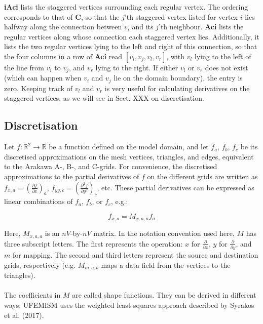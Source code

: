 \documentclass{article}
\begin{document}
\textbf{iAci} lists the staggered vertices surrounding each regular vertex. The ordering corresponds to that of \textbf{C}, so that the $j$'th staggered vertex listed for vertex $i$ lies halfway along the connection between $v_i$ and its $j$'th neighbour. \textbf{Aci} lists the regular vertices along whose connection each staggered vertex lies. Additionally, it lists the two regular vertices lying to the left and right of this connection, so that the four columns in a row of \textbf{Aci} read $[v_i,v_j,v_l,v_r]$, with $v_l$ lying to the left of the line from $v_i$ to $v_j$, and $v_r$ lying to the right. If either $v_l$ or $v_r$ does not exist (which can happen when $v_i$ and $v_j$ lie on the domain boundary), the entry is zero. Keeping track of $v_l$ and $v_r$ is very useful for calculating derivatives on the staggered vertices, as we will see in Sect. XXX on discretisation.\\

\newpage
\subsection{Discretisation}

Let $f: \mathbb{R}^{2} \rightarrow \mathbb{R}$ be a function defined on the model domain, and let $f_a$, $f_b$, $f_c$ be its discretised approximations on the mesh vertices, triangles, and edges, equivalent to the Arakawa A-, B-, and C-grids. For convenience, the discretised approximations to the partial derivatives of $f$ on the different grids are written as $f_{x,a} = {\left( \frac{\partial f}{\partial x} \right)}_a$, $f_{yy,c} = {\left( \frac{\partial^2 f}{\partial y^2} \right)}_c$, etc. These partial derivatives can be expressed as linear combinations of $f_a$, $f_b$, or $f_c$, e.g.:

\begin{equation} \label{eq:disc_mesh_01}
f_{x,a} = M_{x,a,a} f_a
\end{equation}

Here, $M_{x,a,a}$ is an $nV$-by-$nV$ matrix. In the notation convention used here, $M$ has three subscript letters. The first represents the operation: $x$ for $\frac{\partial}{\partial x}$, $y$ for $\frac{\partial}{\partial y}$, and $m$ for mapping. The second and third letters represent the source and destination grids, respectively (e.g. $M_{m,a,b}$ maps a data field from the vertices to the triangles).\\
\\
The coefficients in $M$ are called shape functions. They can be derived in different ways; UFEMISM uses the weighted least-squares approach described by Syrakos et al. (2017).
\end{document}
